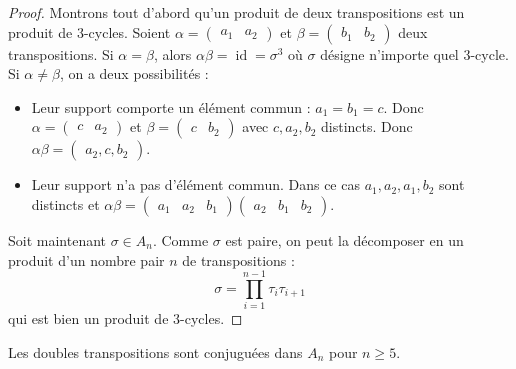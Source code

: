   \begin{proof}
    Montrons tout d'abord qu'un produit de deux transpositions est un produit de $3$-cycles. Soient $\alpha = \begin{pmatrix} a_1 & a_2 \end{pmatrix}$ et $\beta = \begin{pmatrix} b_1 & b_2 \end{pmatrix}$ deux transpositions. Si $\alpha = \beta$, alors $\alpha\beta = \operatorname{id} = \sigma^3$ où $\sigma$ désigne n'importe quel $3$-cycle.
    \newpar
    Si $\alpha \neq \beta$, on a deux possibilités :
    \begin{itemize}
      \item Leur support comporte un élément commun : $a_1 = b_1 = c$. Donc $\alpha = \begin{pmatrix} c & a_2 \end{pmatrix}$ et $\beta = \begin{pmatrix} c & b_2 \end{pmatrix}$ avec $c, a_2, b_2$ distincts. Donc $\alpha\beta = \begin{pmatrix} a_2, c, b_2 \end{pmatrix}$.
      \item Leur support n'a pas d'élément commun. Dans ce cas $a_1, a_2, a_1, b_2$ sont distincts et $\alpha\beta = \begin{pmatrix} a_1 & a_2 & b_1 \end{pmatrix} \begin{pmatrix} a_2 & b_1 & b_2 \end{pmatrix}$.
    \end{itemize}
    Soit maintenant $\sigma \in A_n$. Comme $\sigma$ est paire, on peut la décomposer en un produit d'un nombre pair $n$ de transpositions :
    \[ \sigma = \prod_{i=1}^{n-1} \tau_i\tau_{i+1} \]
    qui est bien un produit de $3$-cycles.
  \end{proof}


  \begin{lemma}
    \label{simplicite-du-groupe-alterne-3}
    Les doubles transpositions sont conjuguées dans $A_n$ pour $n \geq 5$.
  \end{lemma}

